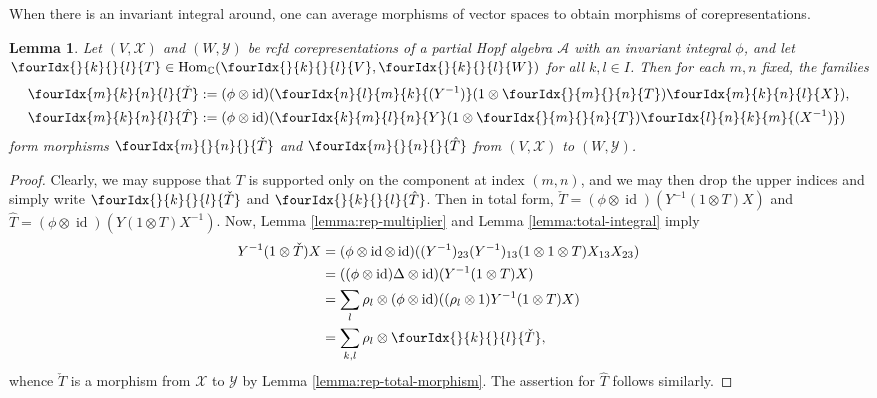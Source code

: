 \documentclass[10pt]{article}
\DeclareMathOperator{\id}{id}
\DeclareMathOperator{\Hom}{Hom}
\newcommand{\C}{\mathbb{C}}
\newcommand{\Gr}[5]{\fourIdx{#2}{#4}{#3}{#5}{#1}}%
\newcommand{\Gru}[3]{\Gr{#1}{}{}{#2}{#3}}
\newcommand{\Grd}[3]{\Gr{#1}{#2}{#3}{}{}}
\newtheorem{Lem}[Theorem]{Lemma}
\theoremstyle{definition}
\numberwithin{equation}{section}
\begin{document}
When there is an invariant integral around, one can average morphisms of vector spaces to obtain morphisms of corepresentations. 
\begin{Lem} \label{lem:rep-average}  Let $(V,\mathscr{X})$ and
  $(W,\mathscr{Y})$ be rcfd corepresentations of  a partial
  Hopf algebra $\mathscr{A}$ with an invariant integral $\phi$, and let
  $\Gru{T}{k}{l} \in \Hom_{\C}(\Gru{V}{k}{l},\Gru{W}{k}{l})$ for all $k,l\in I$. Then for each $m,n$ fixed, the families
  \begin{align*}
    \Gr{\check T}{m}{n}{k}{l} &:= (\phi \otimes
    \id)(\Gr{(Y^{-1})}{n}{m}{l}{k}(1\otimes
    \Gru{T}{m}{n})\Gr{X}{m}{n}{k}{l}), \\
    \Gr{\hat T}{m}{n}{k}{l} &:=(\phi \otimes
    \id)(\Gr{Y}{k}{l}{m}{n}(1\otimes
    \Gru{T}{m}{n})\Gr{(X^{-1})}{l}{k}{n}{m})
  \end{align*} %
form  morphisms $\Grd{\check{T}}{m}{n}$ and $\Grd{\hat{T}}{m}{n}$ from $(V,\mathscr{X})$ to $(W,\mathscr{Y})$. 
\end{Lem} 
\begin{proof} Clearly, we may suppose that $T$ is supported only on the component at index $(m,n)$, and we may then drop the upper indices and simply write $\Gru{\check{T}}{k}{l}$ and $\Gru{\hat{T}}{k}{l}$. Then 
 in total form, $\check{T}=(\phi \otimes \id)(Y^{-1}(1 \otimes T)X)$
  and $\hat{T}=(\phi \otimes \id)(Y(1 \otimes T)X^{-1})$.  Now, Lemma
  \ref{lemma:rep-multiplier} and Lemma \ref{lemma:total-integral} 
  imply
  \begin{align*}
    Y^{-1}(1 \otimes \check{T})X &= (\phi \otimes \id \otimes
    \id)((Y^{-1})_{23}(Y^{-1})_{13}(1 \otimes 1
    \otimes T)X_{13}X_{23})  \\
    &= ((\phi \otimes\id)  \Delta  \otimes \id)(Y^{-1}(1 \otimes T)X) \\
    &= \sum_{l} \rho_{l} \otimes (\phi \otimes \id)((\rho_{l} \otimes
    1)Y^{-1}(1 \otimes T)X)  \\
    &= \sum_{k,l} \rho_{l} \otimes \Gru{\check T}{k}{l},
  \end{align*}
  whence $\check{T}$ is a morphism from $\mathscr{X}$ to $\mathscr{Y}$
  by Lemma \ref{lemma:rep-total-morphism}. The assertion for $\hat
  T$ follows similarly.
\end{proof}
\end{document}

